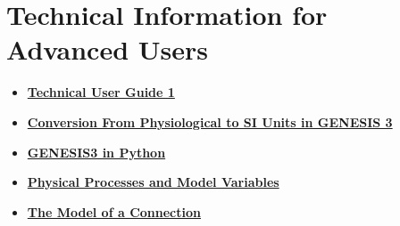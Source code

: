 \documentclass[12pt]{article}
\begin{document}
\section*{Technical Information for Advanced Users}
\begin{itemize}
    \item[] \href{../technical-guide-1/technical-guide-1.tex}{\bf Technical User Guide 1}
    \item[] \href{../units-conversion/units-conversion.tex}
                {\bf Conversion From Physiological to SI Units in GENESIS 3}
   \item[]\href{../g3-python/g3-python.tex}{\bf GENESIS3 in Python}
   \item[]\href{../model-variables/model-variables.tex}{\bf Physical Processes and Model
          Variables}
   \item[]\href{../model-container-connections/model-container-connections.tex}{\bf The
          Model of a Connection}
\end{itemize}
\end{document}
